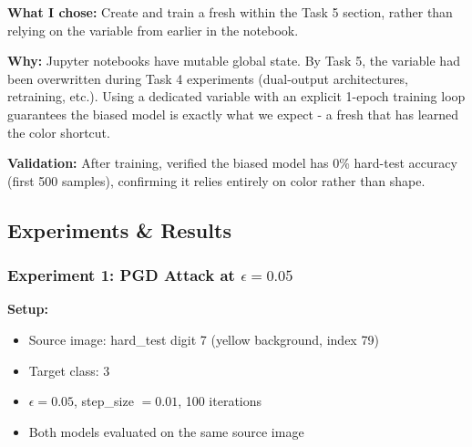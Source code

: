 \documentclass[9pt,a4paper,twocolumn,twoside]{tau-class/tau}
\begin{document}
        \begin{tauenv}[frametitle={Decision: Dedicated \texttt{biased\_model} Instead of Reusing \texttt{model}}]
            \textbf{What I chose:} Create and train a fresh  within the Task 5 section, rather than relying on the  variable from earlier in the notebook.

            \textbf{Why:} Jupyter notebooks have mutable global state. By Task 5, the  variable had been overwritten during Task 4 experiments (dual-output architectures, retraining, etc.). Using a dedicated variable with an explicit 1-epoch training loop guarantees the biased model is exactly what we expect - a fresh  that has learned the color shortcut.

            \textbf{Validation:} After training, verified the biased model has 0\% hard-test accuracy (first 500 samples), confirming it relies entirely on color rather than shape.
        \end{tauenv}

    \subsection{Experiments \& Results}

        \subsubsection{Experiment 1: PGD Attack at $\epsilon = 0.05$}

        \textbf{Setup:}
        \begin{itemize}
            \item Source image: hard\_test digit 7 (yellow background, index 79)
            \item Target class: 3
            \item $\epsilon = 0.05$, step\_size $= 0.01$, 100 iterations
            \item Both models evaluated on the same source image
        \end{itemize}
\end{document}
